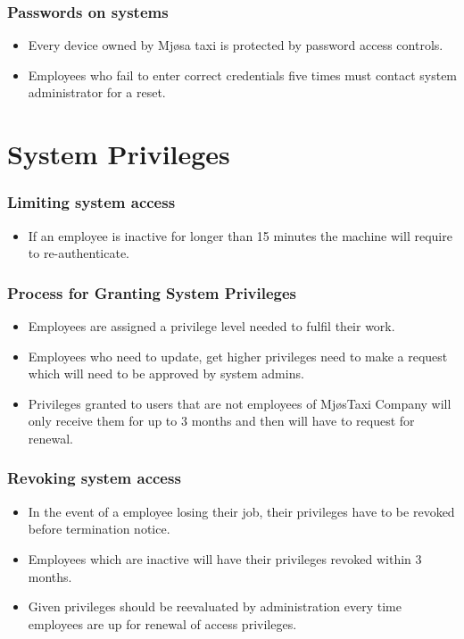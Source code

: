 \subsubsection*{Passwords on systems}
    \begin{itemize}[noitemsep]
        \item Every device owned by Mjøsa taxi is protected by password access controls.
        \item Employees who fail to enter correct credentials five times must contact system administrator for a reset.
    \end{itemize}{}
    
\section{System Privileges}
\subsubsection*{Limiting system access}
    \begin{itemize}[noitemsep]
        \item If an employee is inactive for longer than 15 minutes the machine will require to re-authenticate.
    \end{itemize}
\subsubsection*{Process for Granting System Privileges} 
    \begin{itemize}[noitemsep]
        \item Employees are assigned a privilege level needed to fulfil their work.
        \item Employees who need to update, get higher privileges need to make a request which will need to be approved by system admins.
        \item Privileges granted to users that are not employees of MjøsTaxi Company will only receive them for up to 3 months and then will have to request for renewal.
    \end{itemize}

\subsubsection*{Revoking system access}
    \begin{itemize}[noitemsep]
        \item In the event of a employee losing their job, their privileges have to be revoked before termination notice.
        \item Employees which are inactive will have their privileges revoked within 3 months.
        \item Given privileges should be reevaluated by administration every time employees are up for renewal of access privileges.
    \end{itemize}


